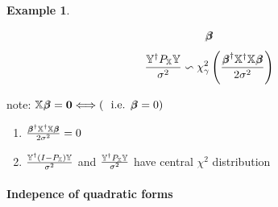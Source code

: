 \documentclass{article}
\newtheorem{example}[theorem]{Example}
\begin{document}
\begin{example}
\begin{enumerate}
\begin{eqnarray*}
\beta\mkern-9.6mu \beta%
\end{eqnarray*}%
\begin{equation*}
\therefore \frac{\mathbb{Y}^{\dagger }P_{\mathbb{X}}\mathbb{Y}}{\sigma ^{2}}%
\backsim \chi _{\gamma }^{2}\left( \frac{%
\beta\mkern-9.6mu \beta%
^{\dagger }\mathbb{X}^{\dagger }\mathbb{X}%
\beta\mkern-9.6mu \beta%
}{2\sigma ^{2}}\right) 
\end{equation*}
\end{enumerate}
\end{example}

\bigskip 

note: $\mathbb{X}%
\beta\mkern-9.6mu \beta%
=\boldsymbol{0}\Longleftrightarrow \left( \text{i.e. }%
\beta\mkern-9.6mu \beta%
=0\right) $

\begin{enumerate}
\item $\frac{%
\beta\mkern-9.6mu \beta%
^{\dagger }\mathbb{X}^{\dagger }\mathbb{X}%
\beta\mkern-9.6mu \beta%
}{2\sigma ^{2}}=0$

\item $\frac{\mathbb{Y}^{\dagger }\left( I-P_{\mathbb{X}}\right) \mathbb{Y}}{%
\sigma ^{2}}$ and $\frac{\mathbb{Y}^{\dagger }P_{\mathbb{X}}\mathbb{Y}}{%
\sigma ^{2}}$ have central $\chi ^{2}$ distribution
\end{enumerate}

\bigskip 

\paragraph{Indepence of quadratic forms}
\end{document}
